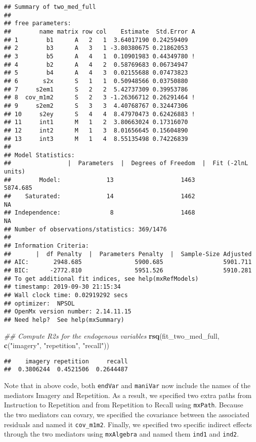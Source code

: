 \documentclass[11pt,]{article}
\newenvironment{Shaded}{\begin{snugshade}}{\end{snugshade}}
\newcommand{\CommentTok}[1]{\textcolor[rgb]{0.56,0.35,0.01}{\textit{#1}}}
\newcommand{\KeywordTok}[1]{\textcolor[rgb]{0.13,0.29,0.53}{\textbf{#1}}}
\newcommand{\NormalTok}[1]{#1}
\newcommand{\StringTok}[1]{\textcolor[rgb]{0.31,0.60,0.02}{#1}}
\begin{document}
\begin{verbatim}
## Summary of two_med_full 
##  
## free parameters:
##        name matrix row col    Estimate  Std.Error A
## 1        b1      A   2   1  3.64017190 0.24259409  
## 2        b3      A   3   1 -3.80380675 0.21862053  
## 3        b5      A   4   1  0.10901983 0.44349780 !
## 4        b2      A   4   2  0.58769683 0.06734947  
## 5        b4      A   4   3  0.02155688 0.07473823  
## 6       s2x      S   1   1  0.50948566 0.03750880  
## 7     s2em1      S   2   2  5.42737309 0.39953786  
## 8  cov_m1m2      S   2   3 -1.26366712 0.26291464 !
## 9     s2em2      S   3   3  4.40768767 0.32447306  
## 10     s2ey      S   4   4  8.47970473 0.62426883 !
## 11     int1      M   1   2  3.80663024 0.17316070  
## 12     int2      M   1   3  8.01656645 0.15604890  
## 13     int3      M   1   4  8.55135498 0.74226839  
## 
## Model Statistics: 
##                |  Parameters  |  Degrees of Freedom  |  Fit (-2lnL units)
##        Model:             13                   1463              5874.685
##    Saturated:             14                   1462                    NA
## Independence:              8                   1468                    NA
## Number of observations/statistics: 369/1476
## 
## Information Criteria: 
##       |  df Penalty  |  Parameters Penalty  |  Sample-Size Adjusted
## AIC:       2948.685               5900.685                 5901.711
## BIC:      -2772.810               5951.526                 5910.281
## To get additional fit indices, see help(mxRefModels)
## timestamp: 2019-09-30 21:15:34 
## Wall clock time: 0.02919292 secs 
## optimizer:  NPSOL 
## OpenMx version number: 2.14.11.15 
## Need help?  See help(mxSummary)
\end{verbatim}

\begin{Shaded}
\begin{Highlighting}[]
\CommentTok{## Compute R2s for the endogenous variables}
\KeywordTok{rsq}\NormalTok{(fit_two_med_full, }\KeywordTok{c}\NormalTok{(}\StringTok{"imagery"}\NormalTok{, }\StringTok{"repetition"}\NormalTok{, }\StringTok{"recall"}\NormalTok{))}
\end{Highlighting}
\end{Shaded}

\begin{verbatim}
##    imagery repetition     recall 
##  0.3806244  0.4521506  0.2644487
\end{verbatim}

Note that in above code, both \texttt{endVar} and \texttt{maniVar} now
include the names of the mediators Imagery and Repetition. As a result,
we specified two extra paths from Instruction to Repetition and from
Repetition to Recall using \texttt{mxPath}. Because the two mediators
can covary, we specified the covariance between the associated residuals
and named it \texttt{cov\_m1m2}. Finally, we specified two specific
indirect effects through the two mediators using \texttt{mxAlgebra} and
named them \texttt{ind1} and \texttt{ind2}.
\end{document}
